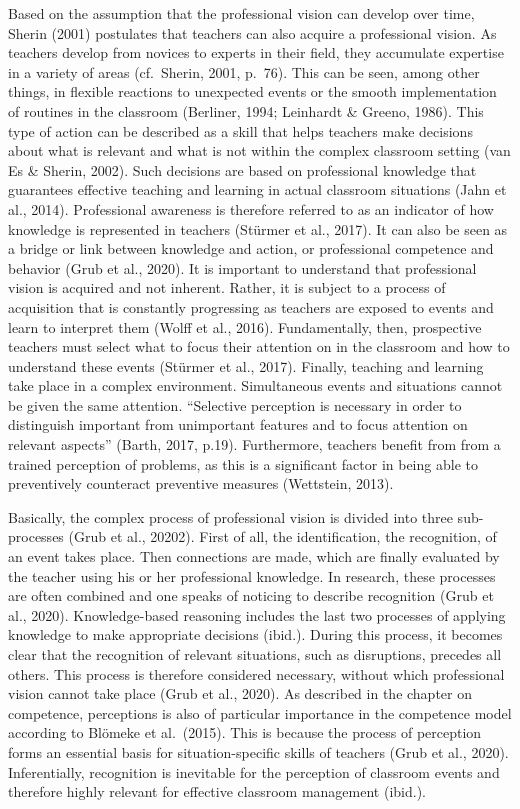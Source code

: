 \documentclass[
  man]{apa6}
\begin{document}
Based on the assumption that the professional vision can develop over time, Sherin (2001) postulates that teachers can also acquire a professional vision. As teachers develop from novices to experts in their field, they accumulate expertise in a variety of areas (cf.~Sherin, 2001, p.~76). This can be seen, among other things, in flexible reactions to unexpected events or the smooth implementation of routines in the classroom (Berliner, 1994; Leinhardt \& Greeno, 1986). This type of action can be described as a skill that helps teachers make decisions about what is relevant and what is not within the complex classroom setting (van Es \& Sherin, 2002). Such decisions are based on professional knowledge that guarantees effective teaching and learning in actual classroom situations (Jahn et al., 2014). Professional awareness is therefore referred to as an indicator of how knowledge is represented in teachers (Stürmer et al., 2017). It can also be seen as a bridge or link between knowledge and action, or professional competence and behavior (Grub et al., 2020). It is important to understand that professional vision is acquired and not inherent. Rather, it is subject to a process of acquisition that is constantly progressing as teachers are exposed to events and learn to interpret them (Wolff et al., 2016). Fundamentally, then, prospective teachers must select what to focus their attention on in the classroom and how to understand these events (Stürmer et al., 2017). Finally, teaching and learning take place in a complex environment. Simultaneous events and situations cannot be given the same attention. ``Selective perception is necessary in order to distinguish important from unimportant features and to focus attention on relevant aspects'' (Barth, 2017, p.19). Furthermore, teachers benefit from from a trained perception of problems, as this is a significant factor in being able to preventively counteract preventive measures (Wettstein, 2013).

Basically, the complex process of professional vision is divided into three sub-processes (Grub et al., 20202). First of all, the identification, the recognition, of an event takes place. Then connections are made, which are finally evaluated by the teacher using his or her professional knowledge. In research, these processes are often combined and one speaks of noticing to describe recognition (Grub et al., 2020). Knowledge-based reasoning includes the last two processes of applying knowledge to make appropriate decisions (ibid.). During this process, it becomes clear that the recognition of relevant situations, such as disruptions, precedes all others. This process is therefore considered necessary, without which professional vision cannot take place (Grub et al., 2020). As described in the chapter on competence, perceptions is also of particular importance in the competence model according to Blömeke et al.~(2015). This is because the process of perception forms an essential basis for situation-specific skills of teachers (Grub et al., 2020). Inferentially, recognition is inevitable for the perception of classroom events and therefore highly relevant for effective classroom management (ibid.).
\end{document}

